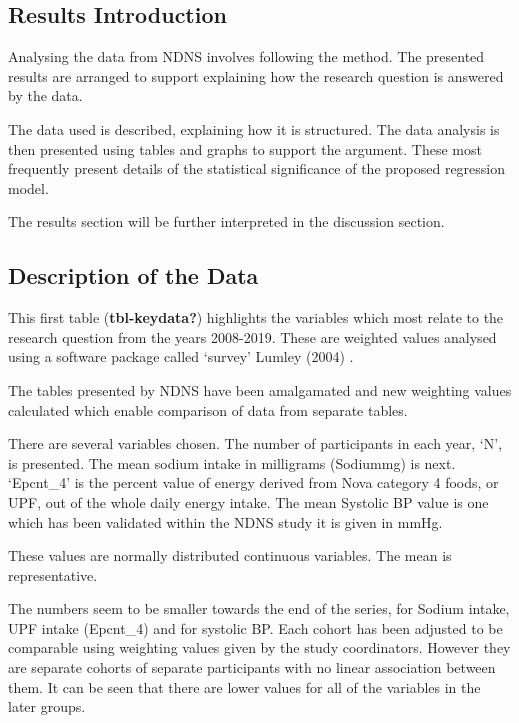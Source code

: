 \documentclass[
]{article}
\begin{document}
\hypertarget{results-introduction}{%
\subsection{Results Introduction}\label{results-introduction}}

Analysing the data from NDNS involves following the method. The
presented results are arranged to support explaining how the research
question is answered by the data.

The data used is described, explaining how it is structured. The data
analysis is then presented using tables and graphs to support the
argument. These most frequently present details of the statistical
significance of the proposed regression model.

The results section will be further interpreted in the discussion
section.

\hypertarget{description-of-the-data-1}{%
\subsection{Description of the Data}\label{description-of-the-data-1}}

This first table (\textbf{tbl-keydata?}) highlights the variables which
most relate to the research question from the years 2008-2019. These are
weighted values analysed using a software package called `survey' Lumley
(2004) .

The tables presented by NDNS have been amalgamated and new weighting
values calculated which enable comparison of data from separate tables.

There are several variables chosen. The number of participants in each
year, `N', is presented. The mean sodium intake in milligrams (Sodiummg)
is next. `Epcnt\_4' is the percent value of energy derived from Nova
category 4 foods, or UPF, out of the whole daily energy intake. The mean
Systolic BP value is one which has been validated within the NDNS study
it is given in mmHg.

These values are normally distributed continuous variables. The mean is
representative.

The numbers seem to be smaller towards the end of the series, for Sodium
intake, UPF intake (Epcnt\_4) and for systolic BP. Each cohort has been
adjusted to be comparable using weighting values given by the study
coordinators. However they are separate cohorts of separate participants
with no linear association between them. It can be seen that there are
lower values for all of the variables in the later groups.
\end{document}

